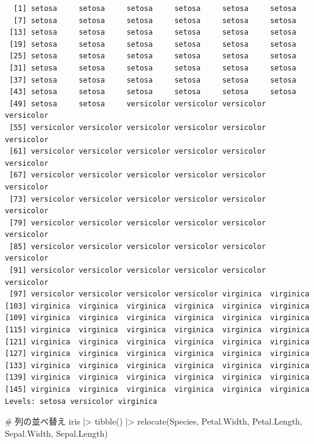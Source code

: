 \documentclass[
  letterpaper,
  DIV=11,
  numbers=noendperiod]{scrreprt}
\newenvironment{Shaded}{\begin{snugshade}}{\end{snugshade}}
\newcommand{\CommentTok}[1]{\textcolor[rgb]{0.37,0.37,0.37}{#1}}
\newcommand{\FunctionTok}[1]{\textcolor[rgb]{0.28,0.35,0.67}{#1}}
\newcommand{\NormalTok}[1]{\textcolor[rgb]{0.00,0.23,0.31}{#1}}
\newcommand{\SpecialCharTok}[1]{\textcolor[rgb]{0.37,0.37,0.37}{#1}}
\begin{document}
\begin{verbatim}
  [1] setosa     setosa     setosa     setosa     setosa     setosa    
  [7] setosa     setosa     setosa     setosa     setosa     setosa    
 [13] setosa     setosa     setosa     setosa     setosa     setosa    
 [19] setosa     setosa     setosa     setosa     setosa     setosa    
 [25] setosa     setosa     setosa     setosa     setosa     setosa    
 [31] setosa     setosa     setosa     setosa     setosa     setosa    
 [37] setosa     setosa     setosa     setosa     setosa     setosa    
 [43] setosa     setosa     setosa     setosa     setosa     setosa    
 [49] setosa     setosa     versicolor versicolor versicolor versicolor
 [55] versicolor versicolor versicolor versicolor versicolor versicolor
 [61] versicolor versicolor versicolor versicolor versicolor versicolor
 [67] versicolor versicolor versicolor versicolor versicolor versicolor
 [73] versicolor versicolor versicolor versicolor versicolor versicolor
 [79] versicolor versicolor versicolor versicolor versicolor versicolor
 [85] versicolor versicolor versicolor versicolor versicolor versicolor
 [91] versicolor versicolor versicolor versicolor versicolor versicolor
 [97] versicolor versicolor versicolor versicolor virginica  virginica 
[103] virginica  virginica  virginica  virginica  virginica  virginica 
[109] virginica  virginica  virginica  virginica  virginica  virginica 
[115] virginica  virginica  virginica  virginica  virginica  virginica 
[121] virginica  virginica  virginica  virginica  virginica  virginica 
[127] virginica  virginica  virginica  virginica  virginica  virginica 
[133] virginica  virginica  virginica  virginica  virginica  virginica 
[139] virginica  virginica  virginica  virginica  virginica  virginica 
[145] virginica  virginica  virginica  virginica  virginica  virginica 
Levels: setosa versicolor virginica
\end{verbatim}

\begin{Shaded}
\begin{Highlighting}[]
\CommentTok{\# 列の並べ替え}
\NormalTok{iris }\SpecialCharTok{|\textgreater{}} \FunctionTok{tibble}\NormalTok{() }\SpecialCharTok{|\textgreater{}} \FunctionTok{relocate}\NormalTok{(Species, Petal.Width, Petal.Length, Sepal.Width, Sepal.Length)}
\end{Highlighting}
\end{Shaded}
\end{document}
